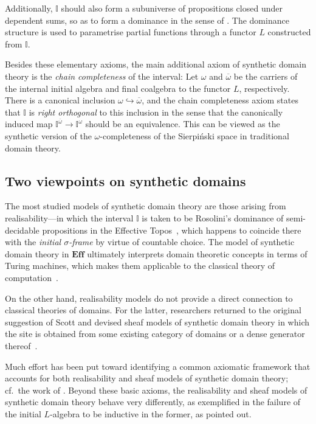 \documentclass[a4paper,12pt]{amsart}
\theoremstyle{definition}
\newcommand{\mbb}[1]{\mathbb{#1}}
\newcommand{\I}{\mbb I}
\newcommand{\ov}[1]{\overline{#1}}
\newcommand{\hook}{\hookrightarrow}
\begin{document}
Additionally, $\I$ should also form a subuniverse of propositions closed under dependent sums, so as to form a dominance in the sense of \citet{rosolini1986continuity}. The dominance structure is used to parametrise partial functions through a functor $L$ constructed from $\I$. 

Besides these elementary axioms, the main additional axiom of synthetic domain theory is the \emph{chain completeness} of the interval: Let $\omega$ and $\ov\omega$ be the carriers of the internal initial algebra and final coalgebra to the functor $L$, respectively. 
There is a canonical inclusion $\omega \hook \ov\omega$, and the chain completeness axiom states that $\I$ is \emph{right orthogonal} to this inclusion in the sense that the canonically induced map $\I^{\ov\omega} \to \I^{\omega}$ should be an equivalence. This can be viewed as the synthetic version of the $\omega$-completeness of the Sierpi\'nski space in traditional domain theory.

\subsection{Two viewpoints on synthetic domains}

The most studied models of synthetic domain theory are those arising from realisability---in which the interval $\I$ is taken to be Rosolini's dominance of semi-decidable propositions in the Effective Topos~\citep{hyland1990first,PhoaWesleyKym-Son1991DtiR}, which happens to coincide there with the \emph{initial $\sigma$-frame} by virtue of countable choice. The model of synthetic domain theory in $\mathbf{Eff}$ ultimately interprets domain theoretic concepts in terms of Turing machines, which makes them applicable to the classical theory of computation~\citep{RN552}. 

On the other hand, realisability models do not provide a direct connection to classical theories of domains. For the latter, researchers returned to the original suggestion of Scott and devised sheaf models of synthetic domain theory in which the site is obtained from some existing category of domains or a dense generator thereof~\cite{fiore-plotkin:1996,FIORE1997151,fiore2001domains}.

Much effort has been put toward identifying a common axiomatic framework that accounts for both realisability and sheaf models of synthetic domain theory; cf.\ the work of \citet{reus-streicher:1999,simpson:2004}. Beyond these basic axioms, the realisability and sheaf models of synthetic domain theory behave very differently, as exemplified in the failure of the initial $L$-algebra to be inductive in the former, as \citet{VANOOSTEN2000233} pointed out.
\end{document}
